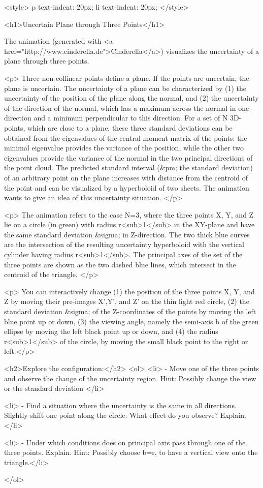 <style>
p {
  text-indent: 20px;
}
li {
  text-indent: 20px;
}
</style>


<h1>Uncertain Plane through Three Points</h1> 


The  animation (generated with  <a href="http://www.cinderella.de">Cinderella</a>) visualizes the uncertainty of a plane through three points.
    
<p> Three non-collinear points define a plane. If the points are uncertain, the plane is uncertain. The uncertainty of a plane can be characterized by (1) the uncertainty of the position of the plane along the normal, and (2) the uncertainty of the direction of the normal, which has a maximum across the normal in one direction and a minimum perpendicular to this direction. For a set of N 3D-points, which are close to a plane, these three standard deviations can be obtained from the eigenvalues of the central moment matrix of the points: the minimal eigenvalue provides the variance of the position, while the other two eigenvalues provide the variance of the normal in the two principal directions of the point cloud. The predicted standard interval (&pm; the standard deviation) of an arbitrary point on the plane increases with distance from the centroid of the point and can be visualized by a hyperboloid of two sheets. The animation wants to give an idea of this uncertainty situation. </p>



<p> The animation refers to the case N=3, where the three points X, Y, and Z lie on a circle (in green) with radius r<sub>1</sub> in the XY-plane and have the same standard deviation &sigma; in Z-direction. The two thick blue curves are the intersection of the resulting uncertainty hyperboloid with the vertical cylinder having radius r<sub>1</sub>. The principal axes of the set of the three points are shown as the two dashed blue lines, which intersect in the centroid of the triangle. </p>

<p> You can interactively change (1) the position of the three points X, Y, and Z by moving their pre-images X',Y', and Z' on the thin light red circle, (2) the standard deviation &sigma; of the Z-coordinates of the points by moving the left blue point up or down, (3) the viewing angle, namely the semi-axis b of the green ellipse by moving the left black point up or down, and (4) the radius r<sub>1</sub> of the circle, by moving the small black point to the right or left.</p> 

    

    <h2>Explore the configuration:</h2>
    <ol>
      <li>  - Move one of the three points and observe the change of the uncertainty region. Hint: Possibly change the view or the standard deviation </li>
 			
 			<li>  - Find a situation where the uncertainty is the same in all directions. Slightly shift one point along the circle. What effect do you observe? Explain.</li>
 			
 			<li>  - Under which conditions does on principal axis pass through one of the three points. Explain. Hint: Possibly choose b=r, to have a vertical view onto the triangle.</li>
 			
	    
	        </ol>